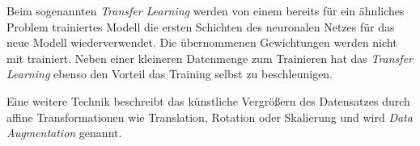 Beim sogenannten \textit{Transfer Learning} werden von einem bereits für ein ähnliches Problem trainiertes Modell die ersten Schichten des neuronalen Netzes für das neue Modell wiederverwendet. Die übernommenen Gewichtungen werden nicht mit trainiert. Neben einer kleineren Datenmenge zum Trainieren hat das \textit{Transfer Learning} ebenso den Vorteil das Training selbst zu beschleunigen. \cite{AurelienGeron.2018}

Eine weitere Technik beschreibt das künstliche Vergrößern des Datensatzes durch affine Transformationen wie Translation, Rotation oder Skalierung und wird \textit{Data Augmentation} genannt. \cite{AurelienGeron.2018}
